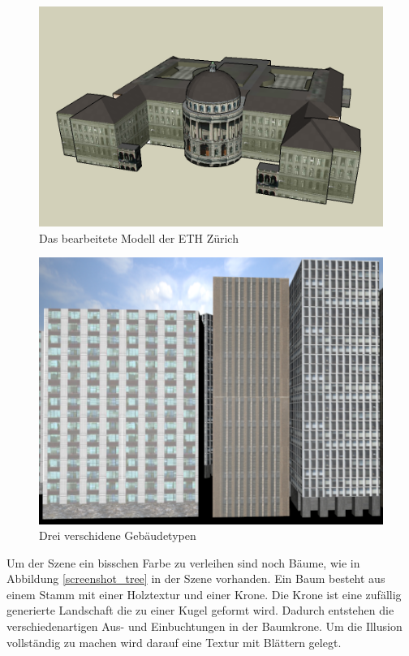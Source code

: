 \begin{figure}[H]
\centering 
\includegraphics[width=1\linewidth]{src/screenshot_googlesketchup.png}
\caption{Das bearbeitete Modell der ETH Zürich} %
\label{googlesketchup_eth} %
\end{figure}

\begin{figure}[H]
\centering 
\includegraphics[scale=0.4]{src/screenshot_buildings.png}
\caption{Drei verschidene Gebäudetypen} %
\label{screenshot_buildings} %
\end{figure}
Um der Szene ein bisschen Farbe zu verleihen sind noch Bäume, wie in Abbildung \ref{screenshot_tree} in der Szene vorhanden. Ein Baum besteht aus einem Stamm mit einer Holztextur und einer Krone. Die Krone ist eine zufällig generierte Landschaft die zu einer Kugel geformt wird. Dadurch entstehen die verschiedenartigen Aus- und Einbuchtungen in der Baumkrone. Um die Illusion vollständig zu machen wird darauf eine Textur mit Blättern gelegt.\\

